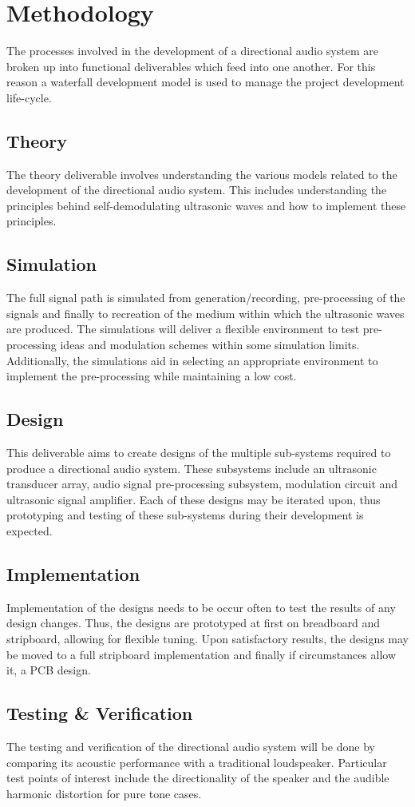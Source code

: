 \section{Methodology}
The processes involved in the development of a directional audio system are broken up into functional deliverables which feed into one another. For this reason a waterfall development model is used to manage the project development life-cycle.
\subsection{Theory}
The theory deliverable involves understanding the various models related to the development of the directional audio system. This includes understanding the principles behind self-demodulating ultrasonic waves and how to implement these principles.
\subsection{Simulation}
The full signal path is simulated from generation/recording, pre-processing of the signals and finally to recreation of the medium within which the ultrasonic waves are produced. The simulations will deliver a flexible environment to test pre-processing ideas and modulation schemes within some simulation limits. Additionally, the simulations aid in selecting an appropriate environment to implement the pre-processing while maintaining a low cost.
\subsection{Design}
This deliverable aims to create designs of the multiple sub-systems required to produce a directional audio system. These subsystems include an ultrasonic transducer array, audio signal pre-processing subsystem, modulation circuit and ultrasonic signal amplifier. Each of these designs may be iterated upon, thus prototyping and testing of these sub-systems during their development is expected.
\subsection{Implementation}
Implementation of the designs needs to be occur often to test the results of any design changes. Thus, the designs are prototyped at first on breadboard and stripboard, allowing for flexible tuning. Upon satisfactory results, the designs may be moved to a full stripboard implementation and finally if circumstances allow it, a PCB design.
\subsection{Testing \& Verification}
The testing and verification of the directional audio system will be done by comparing its acoustic performance with a traditional loudspeaker. Particular test points of interest include the directionality of the speaker and the audible harmonic distortion for pure tone cases.